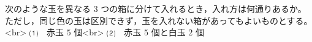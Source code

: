 次のような玉を異なる $3$ つの箱に分けて入れるとき，入れ方は何通りあるか。ただし，同じ色の玉は区別できず，玉を入れない箱があってもよいものとする。<br>
⑴　赤玉 $5$ 個<br>
⑵　赤玉 $5$ 個と白玉 $2$ 個
